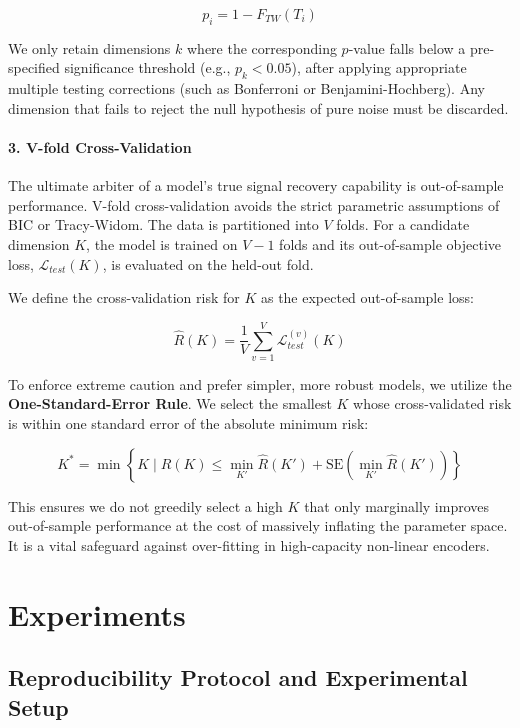 \documentclass[
  letterpaper,
]{report}
\begin{document}
\[
p_i = 1 - F_{TW}(T_i)
\]

We only retain dimensions \(k\) where the corresponding \(p\)-value
falls below a pre-specified significance threshold (e.g.,
\(p_k < 0.05\)), after applying appropriate multiple testing corrections
(such as Bonferroni or Benjamini-Hochberg). Any dimension that fails to
reject the null hypothesis of pure noise must be discarded.

\subsubsection{3. V-fold
Cross-Validation}\label{v-fold-cross-validation}

The ultimate arbiter of a model's true signal recovery capability is
out-of-sample performance. V-fold cross-validation avoids the strict
parametric assumptions of BIC or Tracy-Widom. The data is partitioned
into \(V\) folds. For a candidate dimension \(K\), the model is trained
on \(V-1\) folds and its out-of-sample objective loss,
\(\mathcal{L}_{test}(K)\), is evaluated on the held-out fold.

We define the cross-validation risk for \(K\) as the expected
out-of-sample loss:

\[
\hat{R}(K) = \frac{1}{V} \sum_{v=1}^V \mathcal{L}_{test}^{(v)}(K)
\]

To enforce extreme caution and prefer simpler, more robust models, we
utilize the \textbf{One-Standard-Error Rule}. We select the smallest
\(K\) whose cross-validated risk is within one standard error of the
absolute minimum risk:

\[
K^* = \min \left\{ K \mid \hat{R}(K) \leq \min_{K'} \hat{R}(K') + \text{SE}\left(\min_{K'} \hat{R}(K')\right) \right\}
\]

This ensures we do not greedily select a high \(K\) that only marginally
improves out-of-sample performance at the cost of massively inflating
the parameter space. It is a vital safeguard against over-fitting in
high-capacity non-linear encoders.


\chapter{Experiments}\label{experiments}

\section{Reproducibility Protocol and Experimental
Setup}\label{reproducibility-protocol-and-experimental-setup}
\end{document}
